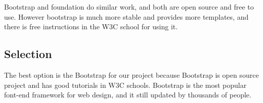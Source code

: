 Bootstrap and foundation do similar work, and both are open source and free to use.
However bootstrap is much more stable and provides more templates, and there is free instructions in the W3C school for using it.

\subsection{Selection}

The best option is the Bootstrap for our project because Bootstrap is open source project and has good tutorials in W3C schools.
Bootstrap is the most popular font-end framework for web design, and it still updated by thousands of people.
